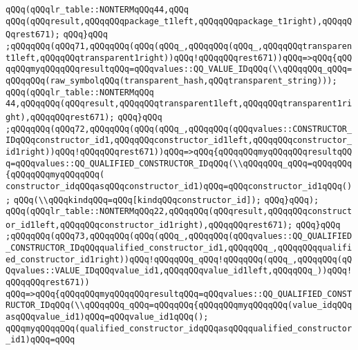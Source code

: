\verb|qQQq(qQQqlr_table::NONTERMqQQq44,qQQq|\newline
\verb|qQQq(qQQqresult,qQQqqQQqpackage_t1left,qQQqqQQqpackage_t1right),qQQqqQQqrest671);|\newline
\verb|qQQq}qQQq|\newline
\verb|;qQQqqQQq(qQQq71,qQQqqQQq(qQQq(qQQq_,qQQqqQQq(qQQq_,qQQqqQQqtransparent1left,qQQqqQQqtransparent1right))qQQq!qQQqqQQqrest671))qQQq=>qQQq{qQQqqQQqmyqQQqqQQqresultqQQq=qQQqvalues::QQ_VALUE_IDqQQq(\\qQQqqQQq_qQQq=qQQqqQQq(raw_symbolqQQq(transparent_hash,qQQqtransparent_string)));|\newline
\verb|qQQq(qQQqlr_table::NONTERMqQQq|\newline
\verb|44,qQQqqQQq(qQQqresult,qQQqqQQqtransparent1left,qQQqqQQqtransparent1right),qQQqqQQqrest671);|\newline
\verb|qQQq}qQQq|\newline
\verb|;qQQqqQQq(qQQq72,qQQqqQQq(qQQq(qQQq_,qQQqqQQq(qQQqvalues::CONSTRUCTOR_IDqQQqconstructor_id1,qQQqqQQqconstructor_id1left,qQQqqQQqconstructor_id1right))qQQq!qQQqqQQqrest671))qQQq=>qQQq{qQQqqQQqmyqQQqqQQqresultqQQq=qQQqvalues::QQ_QUALIFIED_CONSTRUCTOR_IDqQQq(\\qQQqqQQq_qQQq=qQQqqQQq{qQQqqQQqmyqQQqqQQq(|\newline
\verb|constructor_idqQQqasqQQqconstructor_id1)qQQq=qQQqconstructor_id1qQQq();|\newline
\verb|qQQq(\\qQQqkindqQQq=qQQq[kindqQQqconstructor_id]);|\newline
\verb|qQQq}qQQq);|\newline
\verb|qQQq(qQQqlr_table::NONTERMqQQq22,qQQqqQQq(qQQqresult,qQQqqQQqconstructor_id1left,qQQqqQQqconstructor_id1right),qQQqqQQqrest671);|\newline
\verb|qQQq}qQQq|\newline
\verb|;qQQqqQQq(qQQq73,qQQqqQQq(qQQq(qQQq_,qQQqqQQq(qQQqvalues::QQ_QUALIFIED_CONSTRUCTOR_IDqQQqqualified_constructor_id1,qQQqqQQq_,qQQqqQQqqualified_constructor_id1right))qQQq!qQQqqQQq_qQQq!qQQqqQQq(qQQq_,qQQqqQQq(qQQqvalues::VALUE_IDqQQqvalue_id1,qQQqqQQqvalue_id1left,qQQqqQQq_))qQQq!qQQqqQQqrest671))|\newline
\verb|qQQq=>qQQq{qQQqqQQqmyqQQqqQQqresultqQQq=qQQqvalues::QQ_QUALIFIED_CONSTRUCTOR_IDqQQq(\\qQQqqQQq_qQQq=qQQqqQQq{qQQqqQQqmyqQQqqQQq(value_idqQQqasqQQqvalue_id1)qQQq=qQQqvalue_id1qQQq();|\newline
\verb|qQQqmyqQQqqQQq(qualified_constructor_idqQQqasqQQqqualified_constructor_id1)qQQq=qQQq|\newline
